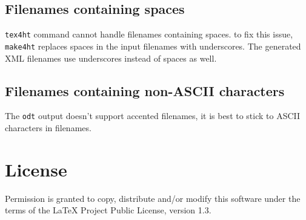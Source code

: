 \hypertarget{filenames-containing-spaces}{%
\subsection{Filenames containing
spaces}\label{filenames-containing-spaces}}

\texttt{tex4ht} command cannot handle filenames containing spaces. to
fix this issue, \texttt{make4ht} replaces spaces in the input filenames
with underscores. The generated XML filenames use underscores instead of
spaces as well.

\hypertarget{filenames-containing-non-ascii-characters}{%
\subsection{Filenames containing non-ASCII
characters}\label{filenames-containing-non-ascii-characters}}

The \texttt{odt} output doesn't support accented filenames, it is best
to stick to ASCII characters in filenames.

\hypertarget{license}{%
\section{License}\label{license}}

Permission is granted to copy, distribute and/or modify this software
under the terms of the LaTeX Project Public License, version 1.3.
